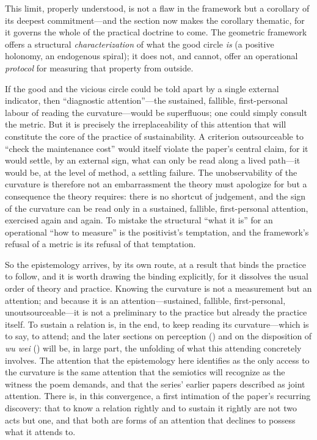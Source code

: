 This limit, properly understood, is not a flaw in the framework but a corollary of its deepest commitment---and the section now makes the corollary thematic, for it governs the whole of the practical doctrine to come. The geometric framework offers a structural \emph{characterization} of what the good circle \emph{is} (a positive holonomy, an endogenous spiral); it does not, and cannot, offer an operational \emph{protocol} for measuring that property from outside.

\begin{claim}
If the good and the vicious circle could be told apart by a single external indicator, then ``diagnostic attention''---the sustained, fallible, first-personal labour of reading the curvature---would be superfluous; one could simply consult the metric. But it is precisely the irreplaceability of this attention that will constitute the core of the practice of sustainability. A criterion outsourceable to ``check the maintenance cost'' would itself violate the paper's central claim, for it would settle, by an external sign, what can only be read along a lived path---it would be, at the level of method, a settling failure. The unobservability of the curvature is therefore not an embarrassment the theory must apologize for but a consequence the theory requires: there is no shortcut of judgement, and the sign of the curvature can be read only in a sustained, fallible, first-personal attention, exercised again and again. To mistake the structural ``what it is'' for an operational ``how to measure'' is the positivist's temptation, and the framework's refusal of a metric is its refusal of that temptation.
\end{claim}

So the epistemology arrives, by its own route, at a result that binds the practice to follow, and it is worth drawing the binding explicitly, for it dissolves the usual order of theory and practice. Knowing the curvature is not a measurement but an attention; and because it is an attention---sustained, fallible, first-personal, unoutsourceable---it is not a preliminary to the practice but already the practice itself.  To sustain a relation is, in the end, to keep reading its curvature---which is to say, to attend; and the later sections on perception () and on the disposition of \emph{wu wei} () will be, in large part, the unfolding of what this attending concretely involves. The attention that the epistemology here identifies as the only access to the curvature is the same attention that the semiotics will recognize as the witness the poem demands, and that the series' earlier papers described as joint attention. There is, in this convergence, a first intimation of the paper's recurring discovery: that to know a relation rightly and to sustain it rightly are not two acts but one, and that both are forms of an attention that declines to possess what it attends to.
